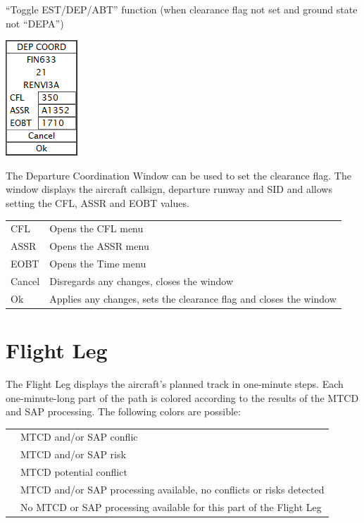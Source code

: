 \documentclass[11pt,a4paper]{memoir}
\newcommand{\colorref}[1]{\textit{\hyperref[#1]{\StrDel{#1}{color:}}}}
\begin{document}
“Toggle EST/DEP/ABT” function (when clearance flag not set and ground state not “DEPA”)

\includegraphics{img/dcw.png}

The Departure Coordination Window can be used to set the clearance flag. The window displays the aircraft callsign, departure runway and SID and allows setting the CFL, ASSR and EOBT values.

\begin{tabular}{l l}
    CFL     & Opens the CFL menu\\
    ASSR    & Opens the ASSR menu\\
    EOBT    & Opens the Time menu\\
    Cancel  & Disregards any changes, closes the window\\
    Ok      & Applies any changes, sets the clearance flag and closes the window\\
\end{tabular}

\section{Flight Leg}
The Flight Leg displays the aircraft’s planned track in one-minute steps. Each one-minute-long part of the
path is colored according to the results of the MTCD and SAP processing. The following colors are possible:
\medskip

\begin{tabular}{l l}
\colorref{color:Urgency FL}      & MTCD and/or SAP conflic\\
\colorref{color:Warning FL}      & MTCD and/or SAP risk\\
\colorref{color:Potential FL}    & MTCD potential conflict\\
\colorref{color:Information FL}  & MTCD and/or SAP processing available, no conflicts or risks detected\\
\colorref{color:Flight Leg}      & No MTCD or SAP processing available for this part of the Flight Leg\\
\end{tabular}
\medskip
\end{document}
